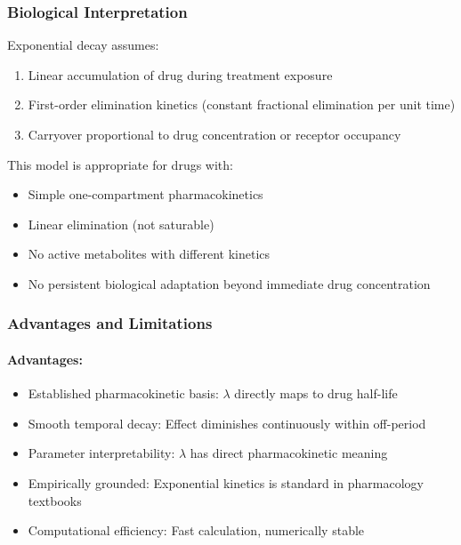 \documentclass[11pt,a4paper]{article}
\begin{document}
\subsubsection{Biological Interpretation}

Exponential decay assumes:

\begin{enumerate}
  \item Linear accumulation of drug during treatment exposure
  \item First-order elimination kinetics (constant fractional elimination per unit time)
  \item Carryover proportional to drug concentration or receptor occupancy
\end{enumerate}

This model is appropriate for drugs with:

\begin{itemize}
  \item Simple one-compartment pharmacokinetics
  \item Linear elimination (not saturable)
  \item No active metabolites with different kinetics
  \item No persistent biological adaptation beyond immediate drug concentration
\end{itemize}

\subsubsection{Advantages and Limitations}

\paragraph{Advantages:}
\begin{itemize}
  \item Established pharmacokinetic basis: $\lambda$ directly maps to drug half-life
  \item Smooth temporal decay: Effect diminishes continuously within off-period
  \item Parameter interpretability: $\lambda$ has direct pharmacokinetic meaning
  \item Empirically grounded: Exponential kinetics is standard in pharmacology textbooks
  \item Computational efficiency: Fast calculation, numerically stable
\end{itemize}
\end{document}
